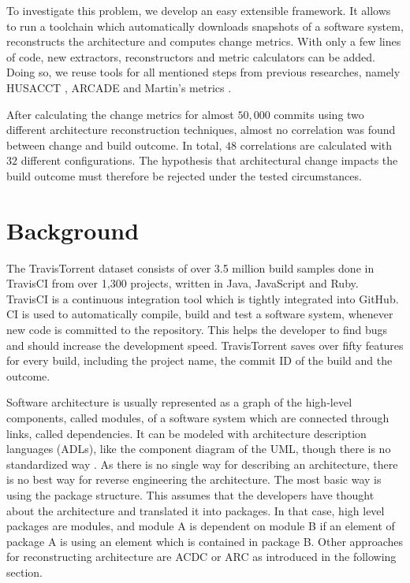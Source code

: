 \documentclass[sigplan, anonymous, review]{acmart}
\begin{document}
To investigate this problem, we develop an easy extensible framework. It allows to run a toolchain which automatically downloads snapshots of a software system, reconstructs the architecture and computes change metrics. With only a few lines of code, new extractors, reconstructors and metric calculators can be added. Doing so, we reuse tools for all mentioned steps from previous researches, namely HUSACCT \cite{Husacct1}, ARCADE \cite{Arcade} and Martin's metrics \cite{martinsMetrics}.

After calculating the change metrics for almost $50,000$ commits using two different architecture reconstruction techniques, almost no correlation was found between change and build outcome. In total, $48$ correlations are calculated with $32$ different configurations. The hypothesis that architectural change impacts the build outcome must therefore be rejected under the tested circumstances. 

\section{Background}

The TravisTorrent dataset \cite{TravisTorrent} consists of over 3.5 million build samples done in TravisCI from over 1,300 projects, written in Java, JavaScript and Ruby. TravisCI is a continuous integration tool which is tightly integrated into GitHub. CI is used to automatically compile, build and test a software system, whenever new code is committed to the repository. This helps the developer to find bugs and should increase the development speed. 
TravisTorrent saves over fifty features for every build, including the project name, the commit ID of the build and the outcome.

Software architecture is usually represented as a graph of the high-level components, called modules, of a software system which are connected through links, called dependencies. It can be modeled with architecture description languages (ADLs), like the component diagram of the UML, though there is no standardized way \cite{UML-Arch}. 
As there is no single way for describing an architecture, there is no best way for reverse engineering the architecture. The most basic way is using the package structure. This assumes that the developers have thought about the architecture and translated it into packages. In that case, high level packages are modules, and module A is dependent on module B if an element of package A is using an element which is contained in package B.
Other approaches for reconstructing architecture are ACDC or ARC as introduced in the following section.
\end{document}
